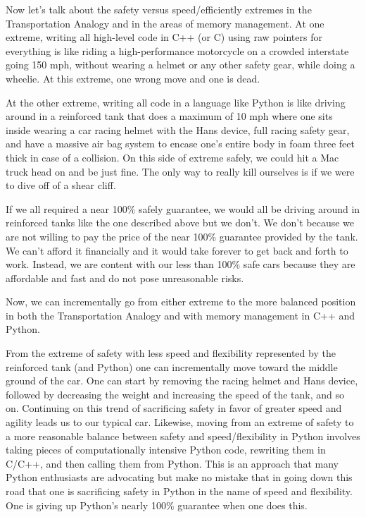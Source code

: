 \documentclass[pdf,ps2pdf,11pt]{SANDreport}
\begin{document}
Now let's talk about the safety versus speed/efficiently extremes in
the Transportation Analogy and in the areas of memory management.  At
one extreme, writing all high-level code in C++ (or C) using raw
pointers for everything is like riding a high-performance motorcycle
on a crowded interstate going 150 mph, without wearing a helmet or any
other safety gear, while doing a wheelie.  At this extreme, one wrong
move and one is dead.

At the other extreme, writing all code in a language like Python is
like driving around in a reinforced tank that does a maximum of 10 mph
where one sits inside wearing a car racing helmet with the Hans
device, full racing safety gear, and have a massive air bag system to
encase one's entire body in foam three feet thick in case of a
collision.  On this side of extreme safely, we could hit a Mac truck
head on and be just fine.  The only way to really kill ourselves is if
we were to dive off of a shear cliff.

If we all required a near 100\% safely guarantee, we would all be
driving around in reinforced tanks like the one described above but we
don't.  We don't because we are not willing to pay the price of the
near 100\% guarantee provided by the tank.  We can't afford it
financially and it would take forever to get back and forth to
work. Instead, we are content with our less than 100\% safe cars
because they are affordable and fast and do not pose unreasonable
risks.

Now, we can incrementally go from either extreme to the more balanced
position in both the Transportation Analogy and with memory management
in C++ and Python.

From the extreme of safety with less speed and flexibility represented
by the reinforced tank (and Python) one can incrementally move toward
the middle ground of the car.  One can start by removing the racing
helmet and Hans device, followed by decreasing the weight and
increasing the speed of the tank, and so on.  Continuing on this trend
of sacrificing safety in favor of greater speed and agility leads us
to our typical car.  Likewise, moving from an extreme of safety to a
more reasonable balance between safety and speed/flexibility in Python
involves taking pieces of computationally intensive Python code,
rewriting them in C/C++, and then calling them from Python.  This is
an approach that many Python enthusiasts are advocating
{}\cite{PythonForSCPerforamnce08} but make no mistake that in going
down this road that one is sacrificing safety in Python in the name of
speed and flexibility.  One is giving up Python's nearly 100\%
guarantee when one does this.
\end{document}
